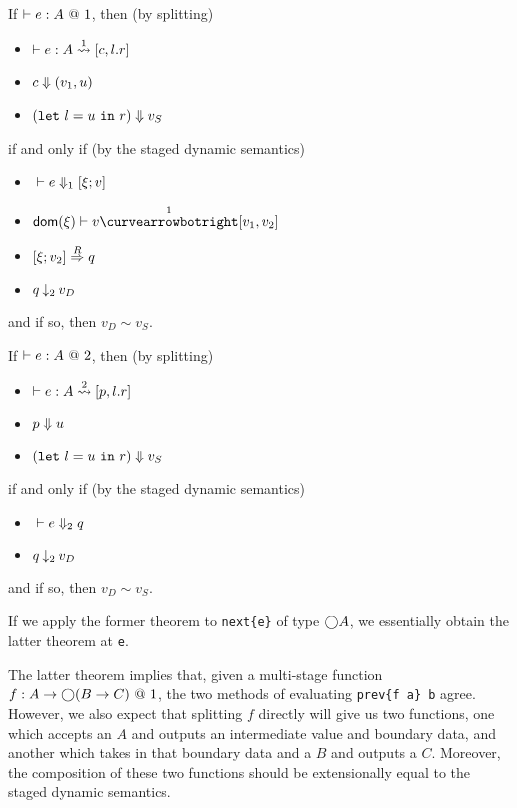 \begin{theorem}
If $\vdash e:A~@~\bbone$, then (by splitting)
\begin{itemize}
\item $\vdash e : A \splitonesym [c,l.r]$
\item $\reduce {c} {(v_1,u)}$
\item $\reduce {(\letin{l}{u}{r})} v_S$
\end{itemize}
if and only if (by the staged dynamic semantics)
\begin{itemize}
\item $\diaone [] e {\xi;v}$
\item $\dom \xi \vdash v \vsplito [v_1,v_2]$
\item $\reify \xi{v_2}q$
\item $q \mathbin{\tworedsym} v_D$
\end{itemize}
and if so, then $v_D \sim v_S$.
\end{theorem}

\begin{theorem}
If $\vdash e:A~@~\bbtwo$, then (by splitting)
\begin{itemize}
\item $\vdash e : A \splittwosym [p,l.r]$
\item $\reduce p u$
\item $\reduce{(\letin{l}{u}{r})}{v_S}$
\end{itemize}
if and only if (by the staged dynamic semantics)
\begin{itemize}
\item $\diatwo [] e q$
\item $q \mathbin{\tworedsym} v_D$
\end{itemize}
and if so, then $v_D \sim v_S$.
\end{theorem}

If we apply the former theorem to \verb|next{e}| of type $\fut A$, we
essentially obtain the latter theorem at \verb|e|.

The latter theorem implies that, given a multi-stage function $f:A\to\fut(B\to
C)~@~\bbone$, the two methods of evaluating \verb|prev{f a} b| agree.
However, we also expect that splitting $f$ directly will give us two functions,
one which accepts an $A$ and outputs an intermediate value and boundary data,
and another which takes in that boundary data and a $B$ and outputs a $C$.
Moreover, the composition of these two functions should be extensionally equal
to the staged dynamic semantics.

